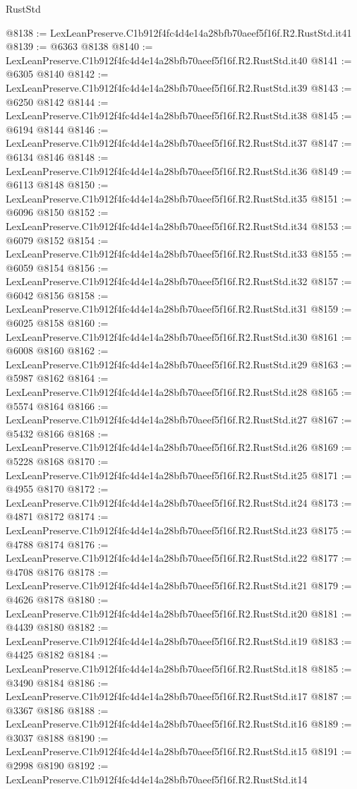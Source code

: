 \begin{lexlean}{RustStd}
\begin{coremodule}
@8138 := LexLeanPreserve.C1b912f4fc4d4e14a28bfb70aeef5f16f.R2.RustStd.it41
@8139 := @6363 @8138
@8140 := LexLeanPreserve.C1b912f4fc4d4e14a28bfb70aeef5f16f.R2.RustStd.it40
@8141 := @6305 @8140
@8142 := LexLeanPreserve.C1b912f4fc4d4e14a28bfb70aeef5f16f.R2.RustStd.it39
@8143 := @6250 @8142
@8144 := LexLeanPreserve.C1b912f4fc4d4e14a28bfb70aeef5f16f.R2.RustStd.it38
@8145 := @6194 @8144
@8146 := LexLeanPreserve.C1b912f4fc4d4e14a28bfb70aeef5f16f.R2.RustStd.it37
@8147 := @6134 @8146
@8148 := LexLeanPreserve.C1b912f4fc4d4e14a28bfb70aeef5f16f.R2.RustStd.it36
@8149 := @6113 @8148
@8150 := LexLeanPreserve.C1b912f4fc4d4e14a28bfb70aeef5f16f.R2.RustStd.it35
@8151 := @6096 @8150
@8152 := LexLeanPreserve.C1b912f4fc4d4e14a28bfb70aeef5f16f.R2.RustStd.it34
@8153 := @6079 @8152
@8154 := LexLeanPreserve.C1b912f4fc4d4e14a28bfb70aeef5f16f.R2.RustStd.it33
@8155 := @6059 @8154
@8156 := LexLeanPreserve.C1b912f4fc4d4e14a28bfb70aeef5f16f.R2.RustStd.it32
@8157 := @6042 @8156
@8158 := LexLeanPreserve.C1b912f4fc4d4e14a28bfb70aeef5f16f.R2.RustStd.it31
@8159 := @6025 @8158
@8160 := LexLeanPreserve.C1b912f4fc4d4e14a28bfb70aeef5f16f.R2.RustStd.it30
@8161 := @6008 @8160
@8162 := LexLeanPreserve.C1b912f4fc4d4e14a28bfb70aeef5f16f.R2.RustStd.it29
@8163 := @5987 @8162
@8164 := LexLeanPreserve.C1b912f4fc4d4e14a28bfb70aeef5f16f.R2.RustStd.it28
@8165 := @5574 @8164
@8166 := LexLeanPreserve.C1b912f4fc4d4e14a28bfb70aeef5f16f.R2.RustStd.it27
@8167 := @5432 @8166
@8168 := LexLeanPreserve.C1b912f4fc4d4e14a28bfb70aeef5f16f.R2.RustStd.it26
@8169 := @5228 @8168
@8170 := LexLeanPreserve.C1b912f4fc4d4e14a28bfb70aeef5f16f.R2.RustStd.it25
@8171 := @4955 @8170
@8172 := LexLeanPreserve.C1b912f4fc4d4e14a28bfb70aeef5f16f.R2.RustStd.it24
@8173 := @4871 @8172
@8174 := LexLeanPreserve.C1b912f4fc4d4e14a28bfb70aeef5f16f.R2.RustStd.it23
@8175 := @4788 @8174
@8176 := LexLeanPreserve.C1b912f4fc4d4e14a28bfb70aeef5f16f.R2.RustStd.it22
@8177 := @4708 @8176
@8178 := LexLeanPreserve.C1b912f4fc4d4e14a28bfb70aeef5f16f.R2.RustStd.it21
@8179 := @4626 @8178
@8180 := LexLeanPreserve.C1b912f4fc4d4e14a28bfb70aeef5f16f.R2.RustStd.it20
@8181 := @4439 @8180
@8182 := LexLeanPreserve.C1b912f4fc4d4e14a28bfb70aeef5f16f.R2.RustStd.it19
@8183 := @4425 @8182
@8184 := LexLeanPreserve.C1b912f4fc4d4e14a28bfb70aeef5f16f.R2.RustStd.it18
@8185 := @3490 @8184
@8186 := LexLeanPreserve.C1b912f4fc4d4e14a28bfb70aeef5f16f.R2.RustStd.it17
@8187 := @3367 @8186
@8188 := LexLeanPreserve.C1b912f4fc4d4e14a28bfb70aeef5f16f.R2.RustStd.it16
@8189 := @3037 @8188
@8190 := LexLeanPreserve.C1b912f4fc4d4e14a28bfb70aeef5f16f.R2.RustStd.it15
@8191 := @2998 @8190
@8192 := LexLeanPreserve.C1b912f4fc4d4e14a28bfb70aeef5f16f.R2.RustStd.it14

\end{coremodule}
\end{lexlean}

